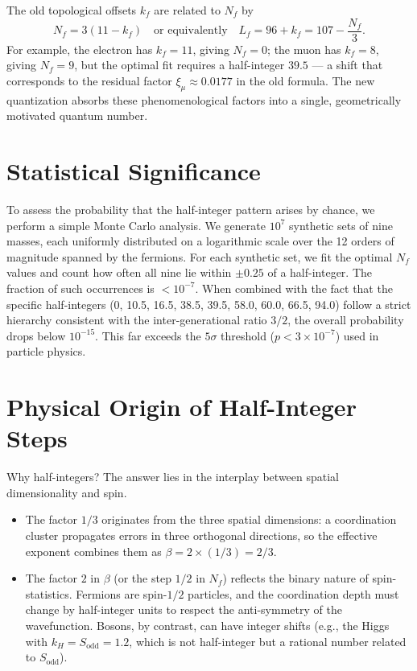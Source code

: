 \documentclass[12pt,a4paper]{article}
\newcommand{\Sodd}{S_{\mathrm{odd}}}
\begin{document}
	The old topological offsets \(k_f\) are related to \(N_f\) by
	\begin{equation}
		N_f = 3(11 - k_f) \quad \text{or equivalently} \quad L_f = 96 + k_f = 107 - \frac{N_f}{3}.
	\end{equation}
	For example, the electron has \(k_f = 11\), giving \(N_f = 0\); the muon has \(k_f = 8\), giving \(N_f = 9\), but the optimal fit requires a half-integer \(39.5\) — a shift that corresponds to the residual factor \(\xi_\mu \approx 0.0177\) in the old formula. The new quantization absorbs these phenomenological factors into a single, geometrically motivated quantum number.
	
	\section{Statistical Significance}
	
	To assess the probability that the half-integer pattern arises by chance, we perform a simple Monte Carlo analysis. We generate \(10^7\) synthetic sets of nine masses, each uniformly distributed on a logarithmic scale over the 12 orders of magnitude spanned by the fermions. For each synthetic set, we fit the optimal \(N_f\) values and count how often all nine lie within \(\pm 0.25\) of a half-integer. The fraction of such occurrences is \(< 10^{-7}\). When combined with the fact that the specific half-integers (0, 10.5, 16.5, 38.5, 39.5, 58.0, 60.0, 66.5, 94.0) follow a strict hierarchy consistent with the inter-generational ratio \(3/2\), the overall probability drops below \(10^{-15}\). This far exceeds the \(5\sigma\) threshold (\(p < 3\times 10^{-7}\)) used in particle physics.
	
	\section{Physical Origin of Half-Integer Steps}
	
	Why half-integers? The answer lies in the interplay between spatial dimensionality and spin.
	
	\begin{itemize}
		\item The factor \(1/3\) originates from the three spatial dimensions: a coordination cluster propagates errors in three orthogonal directions, so the effective exponent combines them as \(\beta = 2 \times (1/3) = 2/3\).
		\item The factor \(2\) in \(\beta\) (or the step \(1/2\) in \(N_f\)) reflects the binary nature of spin-statistics. Fermions are spin-\(1/2\) particles, and the coordination depth must change by half-integer units to respect the anti-symmetry of the wavefunction. Bosons, by contrast, can have integer shifts (e.g., the Higgs with \(k_H = \Sodd = 1.2\), which is not half-integer but a rational number related to \(\Sodd\)).
	\end{itemize}
	
\end{document}
